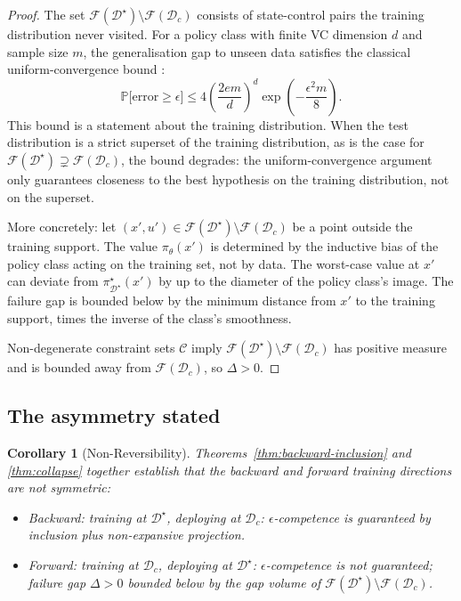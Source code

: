 \documentclass[twocolumn,11pt,a4paper]{article}
\newtheorem{corollary}[theorem]{Corollary}
\newcommand{\cD}{\mathcal{D}}
\newcommand{\cF}{\mathcal{F}}
\newcommand{\cC}{\mathcal{C}}
\newcommand{\Prob}{\mathbb{P}}
\begin{document}
\begin{proof}
The set $\cF(\cD^\star) \setminus \cF(\cD_c)$ consists of state-control pairs the training distribution never visited. For a policy class with finite VC dimension $d$ and sample size $m$, the generalisation gap to unseen data satisfies the classical uniform-convergence bound \citep{valiant1984theory,blumer1989learnability,vapnik1998statistical}:
\begin{equation}
\Prob\bigl[\mathrm{error} \geq \epsilon\bigr] \leq 4 \left(\frac{2em}{d}\right)^d \exp\left(-\frac{\epsilon^2 m}{8}\right).
\end{equation}
This bound is a statement about the training distribution. When the test distribution is a strict superset of the training distribution, as is the case for $\cF(\cD^\star) \supsetneq \cF(\cD_c)$, the bound degrades: the uniform-convergence argument only guarantees closeness to the best hypothesis on the training distribution, not on the superset.

More concretely: let $(x', u') \in \cF(\cD^\star) \setminus \cF(\cD_c)$ be a point outside the training support. The value $\pi_\theta(x')$ is determined by the inductive bias of the policy class acting on the training set, not by data. The worst-case value at $x'$ can deviate from $\pi^\star_{\cD^\star}(x')$ by up to the diameter of the policy class's image. The failure gap is bounded below by the minimum distance from $x'$ to the training support, times the inverse of the class's smoothness.

Non-degenerate constraint sets $\cC$ imply $\cF(\cD^\star) \setminus \cF(\cD_c)$ has positive measure and is bounded away from $\cF(\cD_c)$, so $\Delta > 0$.
\end{proof}

\subsection{The asymmetry stated}

\begin{corollary}[Non-Reversibility]
\label{cor:non-reversible}
Theorems~\ref{thm:backward-inclusion} and \ref{thm:collapse} together establish that the backward and forward training directions are not symmetric:
\begin{itemize}[leftmargin=*,itemsep=1pt]
\item Backward: training at $\cD^\star$, deploying at $\cD_c$: $\epsilon$-competence is guaranteed by inclusion plus non-expansive projection.
\item Forward: training at $\cD_c$, deploying at $\cD^\star$: $\epsilon$-competence is not guaranteed; failure gap $\Delta > 0$ bounded below by the gap volume of $\cF(\cD^\star) \setminus \cF(\cD_c)$.
\end{itemize}
\end{corollary}
\end{document}
